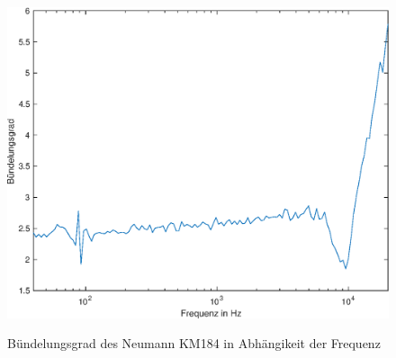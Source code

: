 \begin{figure}[H]
    \centering
    \includegraphics[width=0.8\linewidth]{Figures/Buendelungsgrad}
    \label{fig:buendel}
    \caption{Bündelungsgrad des Neumann KM184 in Abhängikeit der Frequenz}
\end{figure}







